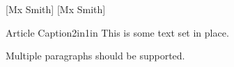 \documentclass{rjlnewsp4}
\begin{document}
\pagestyle{empty}
\begin{newspaper}
  [\hfill Mx Smith]
  [Mx Smith]
  \begin{rasterarticle}[t]{Article Caption}{2in}{1in}
    This is some text set in place.

    Multiple paragraphs should be supported.
  \end{rasterarticle}
\end{newspaper}
\end{document}
